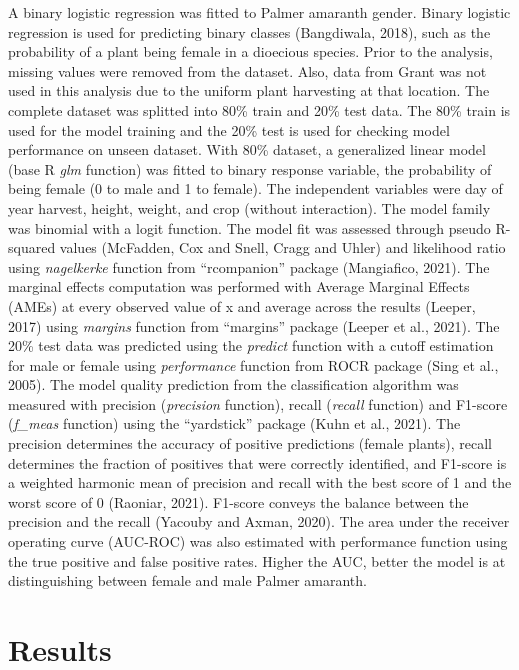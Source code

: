 \documentclass[utf8]{frontiersSCNS}
\begin{document}
A binary logistic regression was fitted to Palmer amaranth gender.
Binary logistic regression is used for predicting binary classes
(Bangdiwala, 2018), such as the probability of a plant being female in a
dioecious species. Prior to the analysis, missing values were removed
from the dataset. Also, data from Grant was not used in this analysis
due to the uniform plant harvesting at that location. The complete
dataset was splitted into 80\% train and 20\% test data. The 80\% train
is used for the model training and the 20\% test is used for checking
model performance on unseen dataset. With 80\% dataset, a generalized
linear model (base R \emph{glm} function) was fitted to binary response
variable, the probability of being female (0 to male and 1 to female).
The independent variables were day of year harvest, height, weight, and
crop (without interaction). The model family was binomial with a logit
function. The model fit was assessed through pseudo R-squared values
(McFadden, Cox and Snell, Cragg and Uhler) and likelihood ratio using
\emph{nagelkerke} function from ``rcompanion'' package (Mangiafico,
2021). The marginal effects computation was performed with Average
Marginal Effects (AMEs) at every observed value of x and average across
the results (Leeper, 2017) using \emph{margins} function from
``margins'' package (Leeper et al., 2021). The 20\% test data was
predicted using the \emph{predict} function with a cutoff estimation for
male or female using \emph{performance} function from ROCR package (Sing
et al., 2005). The model quality prediction from the classification
algorithm was measured with precision (\emph{precision} function),
recall (\emph{recall} function) and F1-score (\emph{f\_meas} function)
using the ``yardstick'' package (Kuhn et al., 2021). The precision
determines the accuracy of positive predictions (female plants), recall
determines the fraction of positives that were correctly identified, and
F1-score is a weighted harmonic mean of precision and recall with the
best score of 1 and the worst score of 0 (Raoniar, 2021). F1-score
conveys the balance between the precision and the recall (Yacouby and
Axman, 2020). The area under the receiver operating curve (AUC-ROC) was
also estimated with performance function using the true positive and
false positive rates. Higher the AUC, better the model is at
distinguishing between female and male Palmer amaranth.

\hypertarget{results}{%
\section*{Results}\label{results}}
\end{document}

